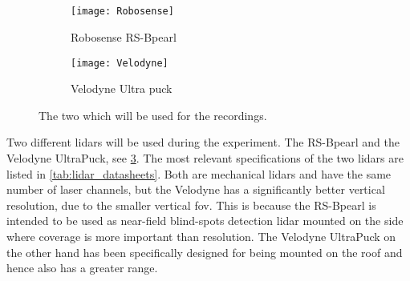 \subsection{}
\begin{figure}[htbp]
    \centering
    \begin{subfigure}{0.45\textwidth}
        \centering
        \texttt{[image: Robosense]}
        \caption{Robosense RS-Bpearl~\cite{RoboSense2020}}
        \label{fig:lidar_robosense}
    \end{subfigure}
    \begin{subfigure}{0.45\textwidth}
        \centering
        \texttt{[image: Velodyne]}
        \caption{Velodyne Ultra puck~\cite{Velodyne2018}}
        \label{fig:lidar_velodyne}
    \end{subfigure}
    \caption[ used in the experiment]{The two  which will be used for the recordings.}
    \label{fig:lidars_used}
\end{figure}
Two different \glspl{lidar} will be used during the experiment.
The RS-Bpearl and the Velodyne UltraPuck, see \cref{fig:lidars_used}.
The most relevant specifications of the two \glspl{lidar} are listed in \cref{tab:lidar_datasheets}.
Both are mechanical \glspl{lidar} and have the same number of laser channels, but the Velodyne has a significantly better vertical resolution, due to the smaller vertical \gls{fov}.
This is because the RS-Bpearl is intended to be used as near-field blind-spots detection \gls{lidar} mounted on the side where coverage is more important than resolution.
The Velodyne UltraPuck on the other hand has been specifically designed for being mounted on the roof and hence also has a greater range.


